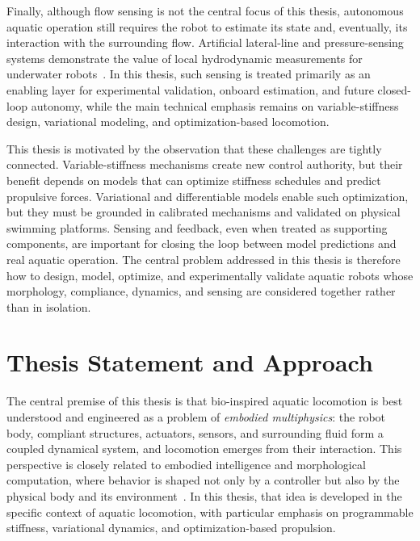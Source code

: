 Finally, although flow sensing is not the central focus of this thesis, autonomous aquatic operation still requires the robot to estimate its state and, eventually, its interaction with the surrounding flow. Artificial lateral-line and pressure-sensing systems demonstrate the value of local hydrodynamic measurements for underwater robots~\cite{zhai2021lateral,ristroph2015lateral,xu2017pressure}. In this thesis, such sensing is treated primarily as an enabling layer for experimental validation, onboard estimation, and future closed-loop autonomy, while the main technical emphasis remains on variable-stiffness design, variational modeling, and optimization-based locomotion.

This thesis is motivated by the observation that these challenges are tightly connected. Variable-stiffness mechanisms create new control authority, but their benefit depends on models that can optimize stiffness schedules and predict propulsive forces. Variational and differentiable models enable such optimization, but they must be grounded in calibrated mechanisms and validated on physical swimming platforms. Sensing and feedback, even when treated as supporting components, are important for closing the loop between model predictions and real aquatic operation. The central problem addressed in this thesis is therefore how to design, model, optimize, and experimentally validate aquatic robots whose morphology, compliance, dynamics, and sensing are considered together rather than in isolation.

\section{Thesis Statement and Approach}
\label{sec:intro_statement}

The central premise of this thesis is that bio-inspired aquatic locomotion is best understood and engineered as a problem of \emph{embodied multiphysics}: the robot body, compliant structures, actuators, sensors, and surrounding fluid form a coupled dynamical system, and locomotion emerges from their interaction. This perspective is closely related to embodied intelligence and morphological computation, where behavior is shaped not only by a controller but also by the physical body and its environment~\cite{pfeifer2007self,pfeifer2009morphological}. In this thesis, that idea is developed in the specific context of aquatic locomotion, with particular emphasis on programmable stiffness, variational dynamics, and optimization-based propulsion.

